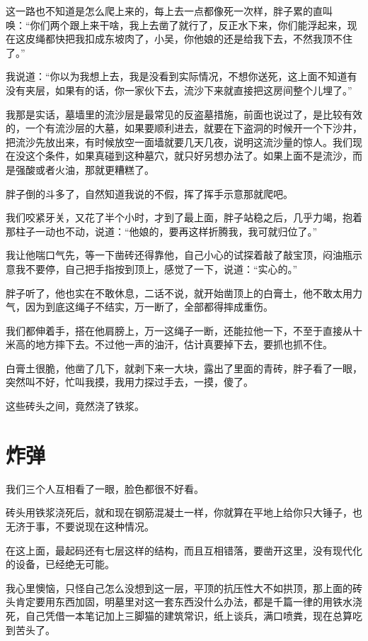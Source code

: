 这一路也不知道是怎么爬上来的，每上去一点都像死一次样，胖子累的直叫唤：“你们两个跟上来干啥，我上去凿了就行了，反正水下来，你们能浮起来，现在这皮绳都快把我扣成东坡肉了，小吴，你他娘的还是给我下去，不然我顶不住了。”

我说道：“你以为我想上去，我是没看到实际情况，不想你送死，这上面不知道有没有夹层，如果有的话，你一家伙下去，流沙下来就直接把这房间整个儿埋了。”

我那是实话，墓墙里的流沙层是最常见的反盗墓措施，前面也说过了，是比较有效的，一个有流沙层的大墓，如果要顺利进去，就要在下盗洞的时候开一个下沙井，把流沙先放出来，有时候放空一面墙就要几天几夜，说明这流沙量的惊人。我们现在没这个条件，如果真碰到这种墓穴，就只好另想办法了。如果上面不是流沙，而是强酸或者火油，那就更糟糕了。

胖子倒的斗多了，自然知道我说的不假，挥了挥手示意那就爬吧。

我们咬紧牙关，又花了半个小时，才到了最上面，胖子站稳之后，几乎力竭，抱着那柱子一动也不动，说道：“他娘的，要再这样折腾我，我可就归位了。”

我让他喘口气先，等一下凿砖还得靠他，自己小心的试探着敲了敲宝顶，闷油瓶示意我不要停，自己把手指按到顶上，感觉了一下，说道：“实心的。”

胖子听了，他也实在不敢休息，二话不说，就开始凿顶上的白膏土，他不敢太用力气，因为到底这绳子不结实，万一断了，全部都得摔成重伤。

我们都伸着手，搭在他肩膀上，万一这绳子一断，还能拉他一下，不至于直接从十米高的地方摔下去。不过他一声的油汗，估计真要掉下去，要抓也抓不住。

白膏土很脆，他凿了几下，就剥下来一大块，露出了里面的青砖，胖子看了一眼，突然叫不好，忙叫我摸，我用力探过手去，一摸，傻了。

这些砖头之间，竟然浇了铁浆。

\chapter{炸弹}

我们三个人互相看了一眼，脸色都很不好看。

砖头用铁浆浇死后，就和现在钢筋混凝土一样，你就算在平地上给你只大锤子，也无济于事，不要说现在这种情况。

在这上面，最起码还有七层这样的结构，而且互相错落，要凿开这里，没有现代化的设备，已经绝无可能。

我心里懊恼，只怪自己怎么没想到这一层，平顶的抗压性大不如拱顶，那上面的砖头肯定要用东西加固，明墓里对这一套东西没什么办法，都是千篇一律的用铁水浇死，自己凭借一本笔记加上三脚猫的建筑常识，纸上谈兵，满口喷粪，现在总算吃到苦头了。

